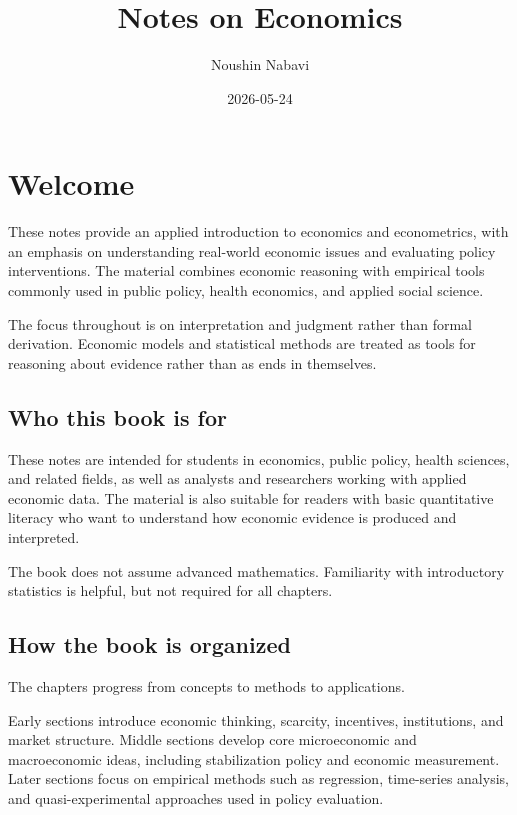 \documentclass[
  11pt,
  oneside]{book}
\title{Notes on Economics}
\author{Noushin Nabavi}
\date{2026-05-24}
\begin{document}
\maketitle

{
\setcounter{tocdepth}{1}
\tableofcontents
}
\chapter{Welcome}\label{welcome}

These notes provide an applied introduction to economics and econometrics, with an emphasis on understanding real-world economic issues and evaluating policy interventions. The material combines economic reasoning with empirical tools commonly used in public policy, health economics, and applied social science.

The focus throughout is on interpretation and judgment rather than formal derivation. Economic models and statistical methods are treated as tools for reasoning about evidence rather than as ends in themselves.

\section{Who this book is for}\label{who-this-book-is-for}

These notes are intended for students in economics, public policy, health sciences, and related fields, as well as analysts and researchers working with applied economic data. The material is also suitable for readers with basic quantitative literacy who want to understand how economic evidence is produced and interpreted.

The book does not assume advanced mathematics. Familiarity with introductory statistics is helpful, but not required for all chapters.

\section{How the book is organized}\label{how-the-book-is-organized}

The chapters progress from concepts to methods to applications.

Early sections introduce economic thinking, scarcity, incentives, institutions, and market structure. Middle sections develop core microeconomic and macroeconomic ideas, including stabilization policy and economic measurement. Later sections focus on empirical methods such as regression, time-series analysis, and quasi-experimental approaches used in policy evaluation.
\end{document}
